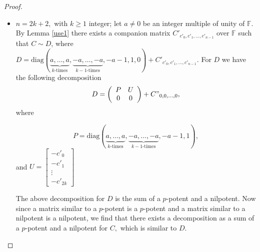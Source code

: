 \documentclass[11pt]{amsart}
\theoremstyle{definition}
\numberwithin{equation}{section}
\newcommand{\diag}{\mathrm{diag}}
\newcommand{\F}{\mathbb{F}}
\begin{document}
\begin{proof}
\begin{itemize}
$U=\begin{bmatrix}
   -c'_0\\
   -c'_1\\
   \vdots\\
   -c'_{k-1}
  \end{bmatrix}$
 and
 $V=\begin{bmatrix}
   -c'_k\\
   -c'_{k+1}\\
   \vdots\\
   -c'_{2k-1}
  \end{bmatrix}$
The above decomposition for $D$ is the sum of a $p$-potent and a nilpotent. Now since a matrix similar to a $p$-potent is a $p$-potent and a matrix similar to a nilpotent is a nilpotent, we find that there exists a decomposition as a sum of a $p$-potent and a nilpotent for $C,$ which is similar to $D$.
\item $n=2k+2,$ with $k\geq 1$ integer; let $a\neq 0$ be an integer multiple of unity of $\F.$ By Lemma \ref{use1} there exists a companion matrix $C'_{c'_0,c'_1,\ldots,c'_{n-1}}$ over $\F$ such that $C\sim D$, where $D=\diag (\underbrace{a,\dots,a }_{k \textrm{-times}} ,\underbrace{-a,\dots,-a }_{k-1 \textrm{-times}} ,-a-1,1,0)+C'_{c'_0,c'_1,\ldots,c'_{n-1}}.$
    For $D$ we have the following decomposition
    $$D=\left(\begin{array}{cc}
P & U \\
0 & 0
\end{array}\right)+C"_{0,0,\dots,0},$$ where

$$P=\diag (\underbrace{a,\dots,a }_{k \textrm{-times}} ,\underbrace{-a,\dots,-a }_{k-1 \textrm{-times}} ,-a-1,1),$$ and
$U=\begin{bmatrix}
    -c'_0\\
    -c'_1\\
   \vdots\\
    -c'_{2k}
  \end{bmatrix}$


The above decomposition for $D$ is the sum of a $p$-potent and a nilpotent. Now since a matrix similar to a $p$-potent is a $p$-potent and a matrix similar to a nilpotent is a nilpotent, we find that there exists a decomposition as a sum of a $p$-potent and a nilpotent for $C,$ which is similar to $D$.
\end{itemize}
\end{proof}
\end{document}
